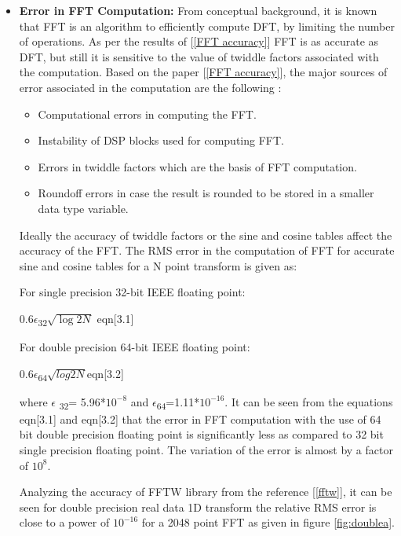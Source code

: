 \begin{itemize}
\item
\textbf{Error in FFT Computation:} From conceptual background, it is known that FFT is an algorithm to efficiently compute DFT, by limiting the number of operations. As per the results of [\ref{FFT accuracy}] FFT is as accurate as DFT, but still it is sensitive to the value of twiddle factors associated with the computation. Based on the paper [\ref{FFT accuracy}], the major sources of error associated in the computation are the following :
\begin{itemize}
\item
Computational errors in computing the FFT.
\item
Instability of DSP blocks used for computing FFT.
\item
Errors in twiddle factors which are the basis of FFT computation.
\item
Roundoff errors in case the result is rounded to be stored in a smaller data type variable.
\end{itemize}
Ideally the accuracy of twiddle factors  or the sine and cosine tables affect the accuracy of the FFT.
The RMS error in the computation of FFT for accurate sine and cosine tables for a N point transform is given as:

\noindent For single precision 32-bit IEEE floating point: 

\hspace{3cm} 0.6$\epsilon$\textsubscript{32}$\sqrt{\log{2}{N}}$ \hfill eqn[3.1]

\noindent For double precision 64-bit IEEE floating point:

\hspace{3cm}0.6$\epsilon$\textsubscript{64}$\sqrt{log{2}{N}}$\hfill eqn[3.2]

\noindent where 
\begin{math}
\epsilon
\end{math}
\textsubscript{32}= 5.96*$10^{-8}$ and $\epsilon$\textsubscript{64}=1.11*$10^{-16}$.
\noindent It can be seen from the equations eqn[3.1] and eqn[3.2] that the error in FFT computation with the use of 64 bit double precision floating point is significantly less as compared to 32 bit single precision floating point. The variation of the error is almost by a factor of $10^{8}$. 

Analyzing the accuracy of FFTW library from the reference [\ref{fftw}], it can be seen for double precision real data 1D transform the relative RMS error is close to a power of $10^{-16}$ for a 2048 point FFT as given in figure \ref{fig:doublea}.


\end{itemize}
